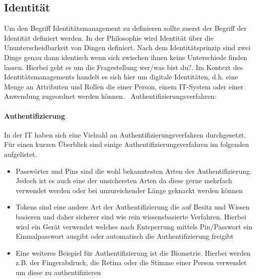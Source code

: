 \documentclass[11pt]{article}
\begin{document}
\subsection{Identität}
Um den Begriff Identitätsmanagement zu definieren sollte zuerst der Begriff der Identität definiert werden. In der Philosophie wird Identität über die Ununterscheidbarkeit von Dingen definiert. Nach dem Identitätsprinzip sind zwei Dinge genau dann identisch wenn sich zwischen ihnen keine Unterschiede finden lassen. Hierbei geht es um die Fragestellung \glqq{}wer/was bist du?\grqq{}. Im Kontext des Identitätsmanagements handelt es sich hier um digitale Identitäten, d.h. eine Menge an Attributen und Rollen die einer Person, einem IT-System oder einer Anwendung zugeordnet werden können.~\cite{tsolkas2017} Authentifizierungsverfahren:
\paragraph{Authentifizierung}
In der IT haben sich eine Vielzahl an Authentifizierungsverfahren durchgesetzt. Für einen kurzen Überblick sind einige Authentifizierungsverfahren im folgenden aufgelistet.
\begin{itemize}
  \item Passwörter und Pins sind die wohl bekanntesten Arten der Authentifizierung. Jedoch ist es auch eine der unsichersten Arten da diese gerne mehrfach verwendet werden oder bei unzureichender Länge geknackt werden können
  \item Tokens sind eine andere Art der Authentifizierung die auf Besitz und Wissen basieren und daher sicherer sind wie rein wissensbasierte Verfahren. Hierbei wird ein Gerät verwendet welches nach Entsperrung mittels Pin/Passwort ein Einmalpasswort ausgibt oder automatisch die Authentifizierung freigibt
  \item Eine weiteres Beispiel für Authentifizierung ist die Biometrie. Hierbei werden z.B. der Fingerabdruck, die Retina oder die Stimme einer Person verwendet um diese zu authentifizieren
\end{itemize}
~\cite{tsolkas2017}
\end{document}
